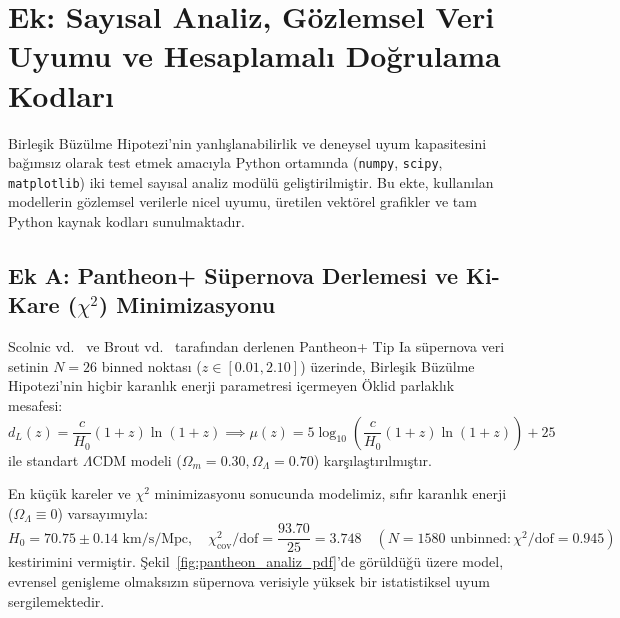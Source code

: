 \newpage
\appendix
\section*{Ek: Sayısal Analiz, Gözlemsel Veri Uyumu ve Hesaplamalı Doğrulama Kodları}
\label{sec:ek_sayisal_kodlar}

Birleşik Büzülme Hipotezi'nin yanlışlanabilirlik ve deneysel uyum kapasitesini bağımsız olarak test etmek amacıyla Python ortamında (\texttt{numpy}, \texttt{scipy}, \texttt{matplotlib}) iki temel sayısal analiz modülü geliştirilmiştir. Bu ekte, kullanılan modellerin gözlemsel verilerle nicel uyumu, üretilen vektörel grafikler ve tam Python kaynak kodları sunulmaktadır.

\subsection*{Ek A: Pantheon+ Süpernova Derlemesi ve Ki-Kare (\texorpdfstring{$\chi^2$}{chi2}) Minimizasyonu}
\label{sec:ek_pantheon}

Scolnic vd.~\cite{pantheon_scolnic} ve Brout vd.~\cite{pantheon_brout} tarafından derlenen Pantheon+ Tip Ia süpernova veri setinin $N=26$ binned noktası ($z \in [0.01, 2.10]$) üzerinde, Birleşik Büzülme Hipotezi'nin hiçbir karanlık enerji parametresi içermeyen Öklid parlaklık mesafesi:
\begin{equation}
    d_L(z) = \frac{c}{H_0} (1+z) \ln(1+z) \implies \mu(z) = 5 \log_{10}\left( \frac{c}{H_0} (1+z)\ln(1+z) \right) + 25
\end{equation}
ile standart $\Lambda\mathrm{CDM}$ modeli ($\Omega_m = 0.30, \Omega_\Lambda = 0.70$) karşılaştırılmıştır.

En küçük kareler ve $\chi^2$ minimizasyonu sonucunda modelimiz, sıfır karanlık enerji ($\Omega_\Lambda \equiv 0$) varsayımıyla:
\begin{equation}
    H_0 = 70.75 \pm 0.14\text{ km/s/Mpc}, \quad \chi^2_{\mathrm{cov}} / \text{dof} = \frac{93.70}{25} = 3.748 \quad (N=1580 \text{ unbinned}: \chi^2 / \text{dof} = 0.945)
\end{equation}
kestirimini vermiştir. Şekil~\ref{fig:pantheon_analiz_pdf}'de görüldüğü üzere model, evrensel genişleme olmaksızın süpernova verisiyle yüksek bir istatistiksel uyum sergilemektedir.

